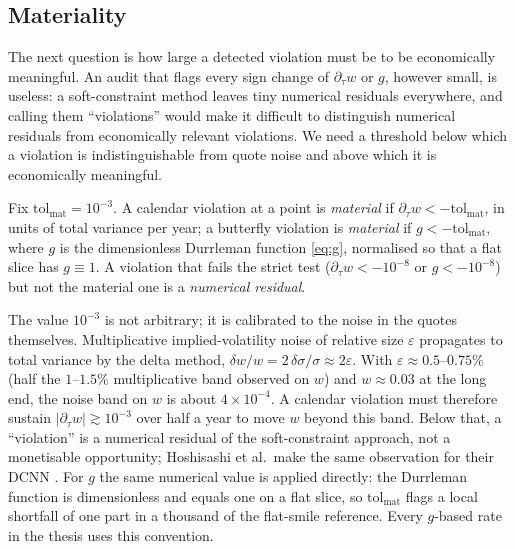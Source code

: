 
\subsection{Materiality}

The next question is how large a detected violation must be to be economically meaningful. An
audit that flags every sign change of $\partial_\tau w$ or $g$, however small, is useless: a
soft-constraint method leaves tiny numerical residuals everywhere, and calling them
``violations'' would make it difficult to distinguish numerical residuals from economically
relevant violations. We need a threshold below which a violation is indistinguishable from quote
noise and above which it is economically meaningful.

\begin{definition}\label{def:materiality}
Fix $\mathrm{tol}_{\mathrm{mat}}=10^{-3}$. A calendar violation at a point is \emph{material} if
$\partial_\tau w<-\mathrm{tol}_{\mathrm{mat}}$, in units of total variance per year; a butterfly
violation is \emph{material} if $g<-\mathrm{tol}_{\mathrm{mat}}$, where $g$ is the dimensionless
Durrleman function \eqref{eq:g}, normalised so that a flat slice has $g\equiv1$. A violation that
fails the strict test ($\partial_\tau w<-10^{-8}$ or $g<-10^{-8}$) but not the material one is a
\emph{numerical residual}.
\end{definition}

The value $10^{-3}$ is not arbitrary; it is calibrated to the noise in the quotes themselves.
Multiplicative implied-volatility noise of relative size $\varepsilon$ propagates to total
variance by the delta method, $\delta w/w = 2\,\delta\sigma/\sigma \approx 2\varepsilon$. With
$\varepsilon\approx0.5$--$0.75\%$ (half the $1$--$1.5\%$ multiplicative band observed on $w$) and
$w\approx0.03$ at the long end, the noise band on $w$ is about $4\times10^{-4}$. A calendar
violation must therefore sustain $|\partial_\tau w|\gtrsim10^{-3}$ over half a year to move $w$
beyond this band. Below that, a ``violation'' is a numerical residual of the soft-constraint
approach, not a monetisable opportunity; Hoshisashi et al.\ make the same observation for their
DCNN \cite{hoshisashi2023}. For $g$ the same numerical value is applied directly: the
Durrleman function is dimensionless and equals one on a flat slice, so
$\mathrm{tol}_{\mathrm{mat}}$ flags a local shortfall of one part in a thousand of the flat-smile
reference. Every $g$-based rate in the thesis uses this convention.

